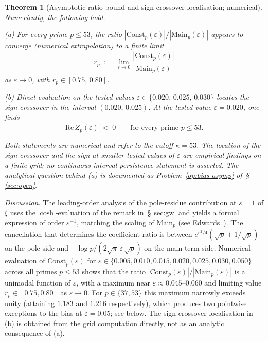\documentclass[11pt]{article}
\newtheorem{theorem}{Theorem}[section]
\newcommand{\Zt}{\widetilde{Z}}
\begin{document}
\begin{theorem}[Asymptotic ratio bound and sign-crossover localisation; numerical]
\label{thm:ratio-signcross}
Numerically, the following hold.

\emph{(a)} For every prime $p\le 53$, the ratio
$|\mathrm{Const}_p(\varepsilon)|/|\mathrm{Main}_p(\varepsilon)|$
appears to converge (numerical extrapolation) to a finite limit
\[
r_p \;:=\; \lim_{\varepsilon\to 0}
\frac{|\mathrm{Const}_p(\varepsilon)|}{|\mathrm{Main}_p(\varepsilon)|}
\]
as $\varepsilon\to 0$, with $r_p\in[0.75,\,0.80]$.

\emph{(b)} Direct evaluation on the tested values
$\varepsilon\in\{0.020,\,0.025,\,0.030\}$ locates the sign-crossover
in the interval $(0.020,\,0.025)$.
At the tested value $\varepsilon=0.020$, one finds
\[
\mathrm{Re}\,\Zt_p(\varepsilon) \;<\; 0 \qquad
\text{for every prime } p\le 53.
\]

Both statements are numerical and refer to the cutoff $\kappa=53$.
The location of the sign-crossover and the sign at smaller tested
values of $\varepsilon$ are empirical findings on a finite grid; no
continuous interval-persistence statement is asserted.
The analytical question behind (a) is documented as
Problem~\ref{op:bias-asymp} of~\S\,\ref{sec:open}.
\end{theorem}

\emph{Discussion.}
The leading-order analysis of the pole-residue contribution at $s=1$
of $\xi$ uses the $\cosh$-evaluation of the remark in~\S\,\ref{sec:gw}
and yields a formal expression of order $\varepsilon^{-1}$, matching
the scaling of $\mathrm{Main}_p$ (see
Edwards~\cite[\S1.16 and \S3.6]{Edwards}).
The cancellation that determines the coefficient ratio is between
$e^{\varepsilon^2/4}(\sqrt p + 1/\sqrt p)$ on the pole side and
$-\log p/(2\sqrt\pi\,\varepsilon\,\sqrt p)$ on the main-term side.
Numerical evaluation of $\mathrm{Const}_p(\varepsilon)$ for
$\varepsilon\in\{0.005,0.010,0.015,0.020,0.025,0.030,0.050\}$ across
all primes $p\le 53$ shows that the ratio
$|\mathrm{Const}_p(\varepsilon)|/|\mathrm{Main}_p(\varepsilon)|$ is a
unimodal function of $\varepsilon$, with a maximum near
$\varepsilon\approx 0.045$--$0.060$ and limiting value
$r_p\in[0.75,0.80]$ as $\varepsilon\to 0$.
For $p\in\{37,53\}$ this maximum narrowly exceeds unity (attaining
$1.183$ and $1.216$ respectively), which produces two pointwise
exceptions to the bias at $\varepsilon=0.05$; see below.
The sign-crossover localisation in (b) is obtained from the grid
computation directly, not as an analytic consequence of (a).
\end{document}
